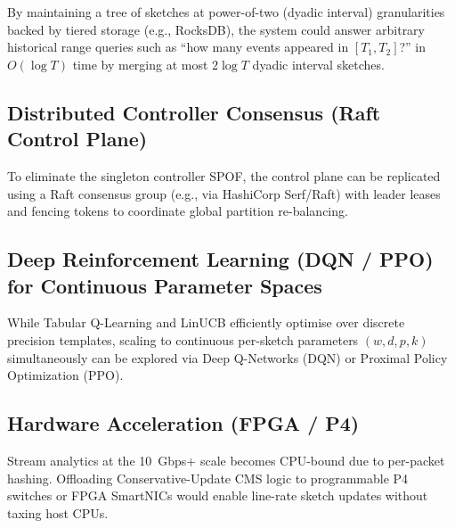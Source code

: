 By maintaining a tree of sketches at power-of-two (dyadic interval) granularities backed by tiered storage (e.g., RocksDB), the system could answer arbitrary historical range queries such as ``how many events appeared in $[T_1, T_2]$?'' in $O(\log T)$ time by merging at most $2\log T$ dyadic interval sketches.

\subsection{Distributed Controller Consensus (Raft Control Plane)}

To eliminate the singleton controller SPOF, the control plane can be replicated using a Raft consensus group (e.g., via HashiCorp Serf/Raft) with leader leases and fencing tokens to coordinate global partition re-balancing.

\subsection{Deep Reinforcement Learning (DQN / PPO) for Continuous Parameter Spaces}

While Tabular Q-Learning and LinUCB efficiently optimise over discrete precision templates, scaling to continuous per-sketch parameters $(w, d, p, k)$ simultaneously can be explored via Deep Q-Networks (DQN) or Proximal Policy Optimization (PPO).

\subsection{Hardware Acceleration (FPGA / P4)}

Stream analytics at the 10~Gbps+ scale becomes CPU-bound due to per-packet hashing. Offloading Conservative-Update CMS logic to programmable P4 switches or FPGA SmartNICs would enable line-rate sketch updates without taxing host CPUs.
